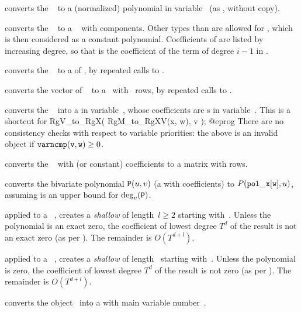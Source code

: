  converts the ~ to a
(normalized) polynomial in variable~ (as , without
copy).

 converts the ~ to a
~ with  components. Other types than  are
allowed for , which is then considered as a constant polynomial.
Coefficients of  are listed by increasing degree, so that 
is the coefficient of the term of degree $i-1$ in .

 converts the ~ to a
 of , by repeated calls to .

 converts the vector of ~
to a~ with ~rows, by repeated calls to .

 converts the ~ into
a  in variable~, whose coefficients are s in
variable~. This is a shortcut for
\bprog
  RgV_to_RgX( RgM_to_RgXV(x, w), v );
@eprog\noindent
There are no consistency checks with respect to variable
priorities: the above is an invalid object if ${\tt varncmp(v, w)} \geq 0$.

 converts the ~ with
 (or constant) coefficients to a matrix with  rows.

 converts the bivariate polynomial
${\tt P}(u,v)$ (a  with  coefficients) to
$P({\tt pol\_x[w]},u)$, assuming  is an upper bound for
$\deg_v({\tt P})$.

 applied to a ~, creates
a \emph{shallow}  of length~$l\geq 2$ starting with~.
Unless the polynomial is an exact zero, the coefficient of lowest degree
$T^d$ of the result is not an exact zero (as per ). The
remainder is $O(T^{d+l})$.

 applied to a ~,
creates a \emph{shallow}  of length~ starting with~.
Unless the polynomial is zero, the coefficient of lowest degree
$T^d$ of the result is not zero (as per ). The
remainder is $O(T^{d+l})$.

 converts the object~ into a 
with main variable number~.

